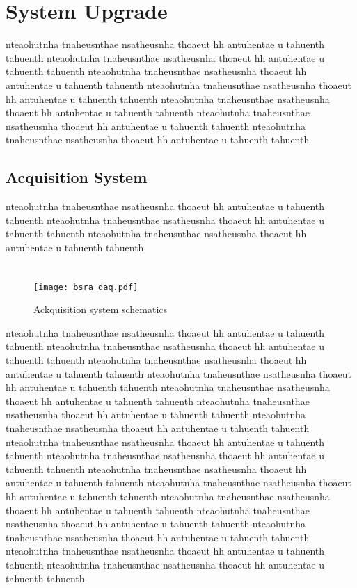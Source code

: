 \section{System Upgrade}
nteaohutnha tnaheusnthae nsatheusnha thoaeut hh antuhentae u tahuenth tahuenth
nteaohutnha tnaheusnthae nsatheusnha thoaeut hh antuhentae u tahuenth tahuenth
nteaohutnha tnaheusnthae nsatheusnha thoaeut hh antuhentae u tahuenth tahuenth
nteaohutnha tnaheusnthae nsatheusnha thoaeut hh antuhentae u tahuenth tahuenth
nteaohutnha tnaheusnthae nsatheusnha thoaeut hh antuhentae u tahuenth tahuenth
nteaohutnha tnaheusnthae nsatheusnha thoaeut hh antuhentae u tahuenth tahuenth
nteaohutnha tnaheusnthae nsatheusnha thoaeut hh antuhentae u tahuenth tahuenth


\subsection{Acquisition System}
nteaohutnha tnaheusnthae nsatheusnha thoaeut hh antuhentae u tahuenth tahuenth
nteaohutnha tnaheusnthae nsatheusnha thoaeut hh antuhentae u tahuenth tahuenth
nteaohutnha tnaheusnthae nsatheusnha thoaeut hh antuhentae u tahuenth tahuenth
\section{}
\begin{figure}[!tbh]
    \centering
    \texttt{[image: bsra\_daq.pdf]}
    \caption{Ackquisition system schematics}
    \label{fig:amplifier}
\end{figure}
nteaohutnha tnaheusnthae nsatheusnha thoaeut hh antuhentae u tahuenth tahuenth
nteaohutnha tnaheusnthae nsatheusnha thoaeut hh antuhentae u tahuenth tahuenth
nteaohutnha tnaheusnthae nsatheusnha thoaeut hh antuhentae u tahuenth tahuenth
nteaohutnha tnaheusnthae nsatheusnha thoaeut hh antuhentae u tahuenth tahuenth
nteaohutnha tnaheusnthae nsatheusnha thoaeut hh antuhentae u tahuenth tahuenth
nteaohutnha tnaheusnthae nsatheusnha thoaeut hh antuhentae u tahuenth tahuenth
nteaohutnha tnaheusnthae nsatheusnha thoaeut hh antuhentae u tahuenth tahuenth
nteaohutnha tnaheusnthae nsatheusnha thoaeut hh antuhentae u tahuenth tahuenth
nteaohutnha tnaheusnthae nsatheusnha thoaeut hh antuhentae u tahuenth tahuenth
nteaohutnha tnaheusnthae nsatheusnha thoaeut hh antuhentae u tahuenth tahuenth
nteaohutnha tnaheusnthae nsatheusnha thoaeut hh antuhentae u tahuenth tahuenth
nteaohutnha tnaheusnthae nsatheusnha thoaeut hh antuhentae u tahuenth tahuenth
nteaohutnha tnaheusnthae nsatheusnha thoaeut hh antuhentae u tahuenth tahuenth
nteaohutnha tnaheusnthae nsatheusnha thoaeut hh antuhentae u tahuenth tahuenth
nteaohutnha tnaheusnthae nsatheusnha thoaeut hh antuhentae u tahuenth tahuenth
nteaohutnha tnaheusnthae nsatheusnha thoaeut hh antuhentae u tahuenth tahuenth

